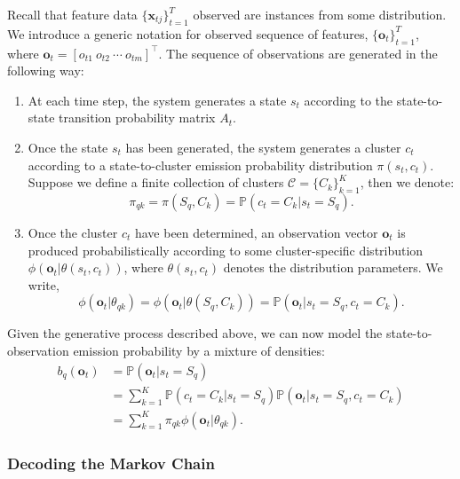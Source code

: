 Recall that feature data $\{ \mathbf{x}_{tj} \}_{t=1}^{T}$ observed are instances from some distribution. We introduce a generic notation for observed sequence of features, $\{ \mathbf{o}_{t} \}_{t=1}^{T}$, where $\mathbf{o}_t = [o_{t1} ~o_{t2} ~\cdots ~o_{tm}]^\top$. The sequence of observations are generated in the following way:
\begin{enumerate}
\item At each time step, the system generates a state $s_t$ according to the state-to-state transition probability matrix $A_t$.
\item Once the state $s_t$ has been generated, the system generates a cluster $c_t$ according to a state-to-cluster emission probability distribution $\pi(s_t,c_t)$. Suppose we define a finite collection of clusters $\mathcal{C} = \{ C_k \}_{k=1}^K$, then we denote:
\begin{equation}
\pi_{qk} = \pi(S_q, C_k) = \mathbb{P} \left( c_t = C_k | s_t = S_q \right).
\end{equation}
\item Once the cluster $c_t$ have been determined, an observation vector $\mathbf{o}_t$ is produced probabilistically according to some cluster-specific distribution $\phi(\mathbf{o}_t | \theta (s_t, c_t))$, where $\theta (s_t, c_t)$ denotes the distribution parameters. We write,
\begin{equation}
\phi(\mathbf{o}_t | \theta_{qk}) =  \phi(\mathbf{o}_t | \theta (S_q, C_k)) = \mathbb{P} \left( \mathbf{o}_t | s_t = S_q, c_t = C_k \right).
\end{equation}
\label{eq:phi}
\end{enumerate}
Given the generative process described above, we can now model the state-to-observation emission probability by a mixture of densities:
\begin{subequations}
\begin{align}
b_q (\mathbf{o}_t) & = \mathbb{P} \left( \mathbf{o}_t | s_t = S_q \right) \\
 & = \sum_{k=1}^K  \mathbb{P} \left( c_t = C_k | s_t = S_q \right) \mathbb{P} \left( \mathbf{o}_t | s_t = S_q, c_t = C_k \right) \\
 & = \sum_{k=1}^K \pi_{qk} \phi(\mathbf{o}_t | \theta_{qk}).
\end{align}
\label{eq:emission}
\end{subequations}

\subsubsection{Decoding the Markov Chain}

